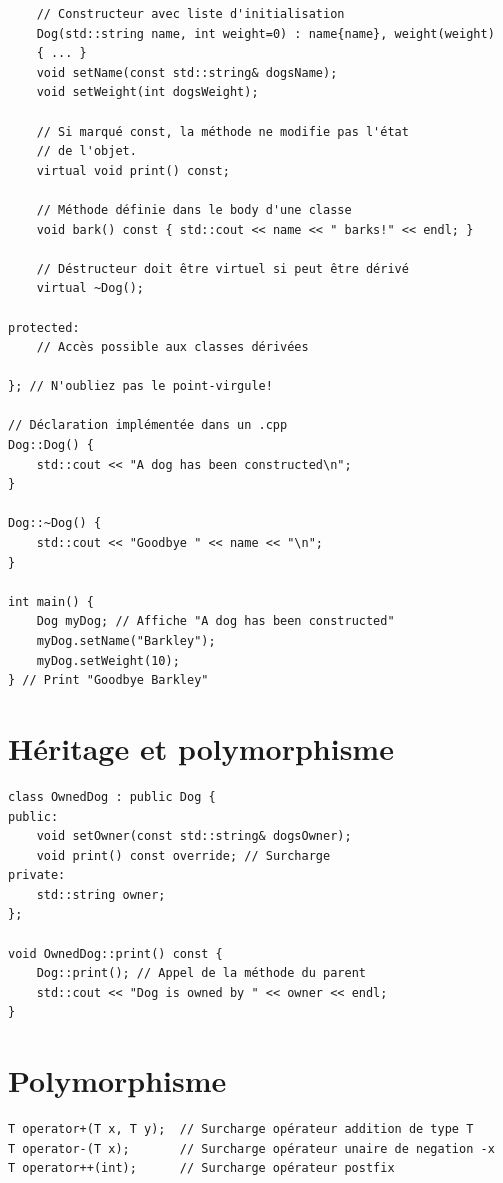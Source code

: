 \documentclass{article}
\begin{document}
\begin{multicols*}{3}
\begin{lstlisting}
    // Constructeur avec liste d'initialisation
    Dog(std::string name, int weight=0) : name{name}, weight(weight)
    { ... }
    void setName(const std::string& dogsName);
    void setWeight(int dogsWeight);

    // Si marqué const, la méthode ne modifie pas l'état
    // de l'objet.
    virtual void print() const;

    // Méthode définie dans le body d'une classe
    void bark() const { std::cout << name << " barks!" << endl; }

    // Déstructeur doit être virtuel si peut être dérivé
    virtual ~Dog();

protected:
    // Accès possible aux classes dérivées

}; // N'oubliez pas le point-virgule!

// Déclaration implémentée dans un .cpp
Dog::Dog() {
    std::cout << "A dog has been constructed\n";
}

Dog::~Dog() {
    std::cout << "Goodbye " << name << "\n";
}

int main() {
    Dog myDog; // Affiche "A dog has been constructed"
    myDog.setName("Barkley");
    myDog.setWeight(10);
} // Print "Goodbye Barkley"
\end{lstlisting}

    \section*{Héritage et polymorphisme}

    \begin{lstlisting}
class OwnedDog : public Dog {
public:
    void setOwner(const std::string& dogsOwner);
    void print() const override; // Surcharge
private:
    std::string owner;
};

void OwnedDog::print() const {
    Dog::print(); // Appel de la méthode du parent
    std::cout << "Dog is owned by " << owner << endl;
}
\end{lstlisting}

    \section*{Polymorphisme}

    \begin{lstlisting}
T operator+(T x, T y);  // Surcharge opérateur addition de type T
T operator-(T x);       // Surcharge opérateur unaire de negation -x
T operator++(int);      // Surcharge opérateur postfix


\end{lstlisting}
\end{multicols*}
\end{document}
